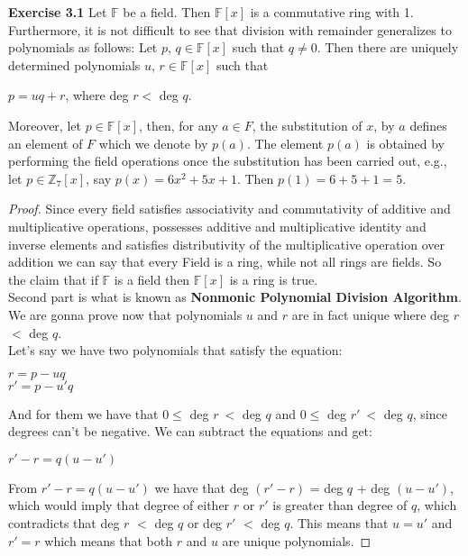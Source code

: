 \documentclass{article}
\newcommand{\subtitle}[1]{%
  \posttitle{%
    \par\end{center}
    \begin{center}\LARGE#1\end{center}
    \vskip0.5em}%
}
\begin{document}
\subtitle{Lecture III}
\noindent \textbf{Exercise 3.1} Let $\mathbb{F}$ be a field. Then $\mathbb{F}[x]$ is a commutative ring with 1. Furthermore, it is not difficult to see that division with remainder generalizes to polynomials as follows: Let $p$, $q \in \mathbb{F}[x]$ such that $q \neq0$. Then there are uniquely determined polynomials $u$, $r \in \mathbb{F}[x]$ such that
\begin{center}
$p = uq + r$, where deg $r<$ deg $q$.	
\end{center}
Moreover, let $p \in \mathbb{F}[x]$, then, for any $a \in F$, the substitution of $x$, by $a$ defines an element of $F$ which we denote by $p(a)$. The element $p(a)$ is obtained by performing the field operations once the substitution has been carried out, e.g., let $p \in \mathbb{Z}_{7}[x]$, say $p(x) = 6x^{2} + 5x + 1$. Then $p(1) = 6 + 5 + 1 = 5$.
\begin{proof}
Since every field satisfies associativity and commutativity of additive and multiplicative operations, possesses additive and multiplicative identity and inverse elements and satisfies distributivity of the multiplicative operation over addition we can say that every Field is a ring, while not all rings are fields. So the claim that if $\mathbb{F}$ is a field then $\mathbb{F}[x]$ is a ring is true.\\
Second part is what is known as \textbf{Nonmonic Polynomial Division Algorithm}. We are gonna prove now that polynomials $u$ and $r$ are in fact unique where deg $r$ $<$ deg $q$.\\
Let's say we have two polynomials that satisfy the equation:
\begin{center}
$r = p - uq$\\
$r' = p - u'q$	
\end{center}
And for them we have that $0 \leq $ deg $r\ <$ deg $q$ and $0 \leq $ deg $r'\ <$ deg $q$, since degrees can't be negative. We can subtract the equations and get:
\begin{center}
$r' - r	= q(u - u')$
\end{center}
From $r' - r	= q(u - u')$ we have that deg $(r' - r)$ = deg $q$ + deg $(u - u')$, which would imply that degree of either $r$ or $r'$ is greater than degree of $q$, which contradicts that deg $r$ $<$ deg $q$ or deg $r'$ $<$ deg $q$. This means that $u=u'$ and $r'=r$ which means that both $r$ and $u$ are unique polynomials.

\end{proof}
\end{document}
